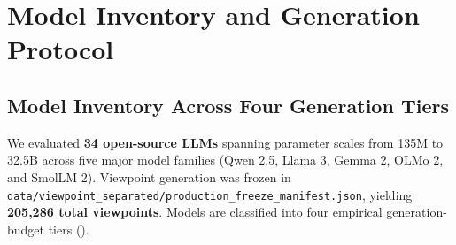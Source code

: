 \documentclass[11pt,a4paper]{article}
\begin{document}
\section{Model Inventory and Generation Protocol}
\label{sec:model_inventory}

\subsection{Model Inventory Across Four Generation Tiers}
We evaluated \textbf{34 open-source LLMs} spanning parameter scales from 135M to 32.5B across five major model families (Qwen 2.5, Llama 3, Gemma 2, OLMo 2, and SmolLM 2). Viewpoint generation was frozen in \texttt{data/viewpoint\_separated/production\_freeze\_manifest.json}, yielding \textbf{205,286 total viewpoints}. Models are classified into four empirical generation-budget tiers ().
\end{document}
